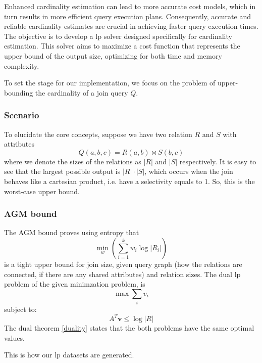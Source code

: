 Enhanced cardinality estimation
can lead to more accurate cost models, which in turn results
in more efficient query execution plans.
Consequently, accurate and reliable cardinality estimates are
crucial in achieving faster query execution times.
The objective is to develop a \gls{lp}
solver designed specifically for cardinality estimation.
This solver aims to maximize a cost function that represents
the upper bound of the output size, optimizing for both
time and memory complexity.

To set the stage for our implementation,
we focus on the problem of upper-bounding the
cardinality of a join query $Q$.

\subsubsection{Scenario}
To elucidate the core concepts,
suppose we have two relation $R$ and $S$ with attributes
\[
    Q(a, b, c) = R(a, b) \Join S(b, c)
\]
where we denote the sizes of the relations as
$|R|$ and $|S|$ respectively.
It is easy to see that the largest possible output is $|R| \cdot |S|$, which occurs when the join
behaves like a cartesian product, i.e. have a selectivity equals to 1. So, this is the worst-case
upper bound.

\subsubsection{AGM bound}
The AGM bound \parencite{atserias2013size} proves
using entropy that \[ \min_w \left( \sum_{i=1}^{k} w_i \log |R_i| \right) \]
is a tight upper bound for join size, given query graph (how the
relations are connected, if there are any shared attributes)
and relation sizes.
The dual \gls{lp} problem of the given minimzation problem, is
\[ \max \sum_{i} v_i \]
subject to:
\[ A^T \mathbf{v} \leq \log |R| \]
The dual theorem \ref{duality} states that the both problems have the same
optimal values.

This is how our \gls{lp} datasets are generated.

